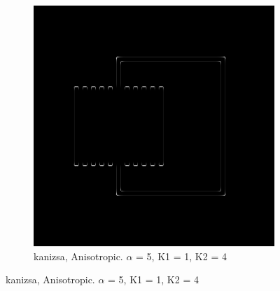 \begin{figure}[H]
\centering 
  \begin{subfigure}{.7\textwidth}
    \centering
    \includegraphics[width=.9\textwidth]{./canny/kanizsa_ANISO_a5_k11_k24}
    \caption{kanizsa, Anisotropic. $\alpha$ = 5, K1 = 1, K2 = 4}
    \label{fig:kanizsa_ANISO_a5_k11_k24}
  \end{subfigure}%
  
\end{figure}